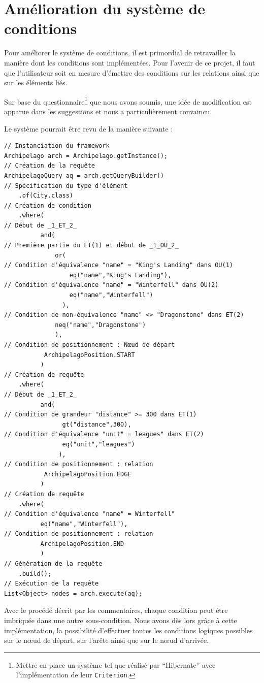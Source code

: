 \documentclass[a4paper,fleqn,12pt,oneside]{book}
\begin{document}
\section{Amélioration du système de conditions}

Pour améliorer le système de conditions, il est primordial de retravailler la manière dont les conditions sont implémentées. Pour l'avenir de ce projet, il faut que l'utilisateur soit en mesure d'émettre des conditions sur les relations ainsi que sur les éléments liés.

Sur base du questionnaire\footnote{Mettre en place un système tel que réalisé par \enquote{Hibernate} avec l'implémentation de leur \texttt{Criterion}.} que nous avons soumis, une idée de modification est apparue dans les suggestions et nous a particulièrement convaincu. 

Le système pourrait être revu de la manière suivante : 

\begin{lstlisting}
// Instanciation du framework
Archipelago arch = Archipelago.getInstance();
// Création de la requête
ArchipelagoQuery aq = arch.getQueryBuilder()  
// Spécification du type d'élément
    .of(City.class) 						  
// Création de condition
    .where(									  
// Début de _1_ET_2_
    	  and( 							      
// Première partie du ET(1) et début de _1_OU_2_
              or(							  
// Condition d'équivalence "name" = "King's Landing" dans OU(1)
      	          eq("name","King's Landing"),
// Condition d'équivalence "name" = "Winterfell" dans OU(2)
    	          eq("name","Winterfell")     
    	        ),
// Condition de non-équivalence "name" <> "Dragonstone" dans ET(2)
    	      neq("name","Dragonstone")       
    	      ),
// Condition de positionnement : Nœud de départ
    	   ArchipelagoPosition.START          
    	  )
// Création de requête
    .where(     
// Début de _1_ET_2_                                  
          and(        
// Condition de grandeur "distance" >= 300 dans ET(1)                                 
      	        gt("distance",300),
// Condition d'équivalence "unit" = leagues" dans ET(2)           
    	        eq("unit","leagues")          
    	       ),
// Condition de positionnement : relation
    	   ArchipelagoPosition.EDGE           
    	  )
// Création de requête
    .where(
// Condition d'équivalence "name" = Winterfell"
          eq("name","Winterfell"),
// Condition de positionnement : relation
    	  ArchipelagoPosition.END
    	  )
// Génération de la requête
    .build();
// Exécution de la requête
List<Object> nodes = arch.execute(aq);

\end{lstlisting} 
Avec le procédé décrit par les commentaires, chaque condition peut être imbriquée dans une autre sous-condition. Nous avons dès lors grâce à cette implémentation, la possibilité d'effectuer toutes les conditions logiques possibles sur le nœud de départ, sur l'arête ainsi que sur le nœud d'arrivée.
\end{document}

